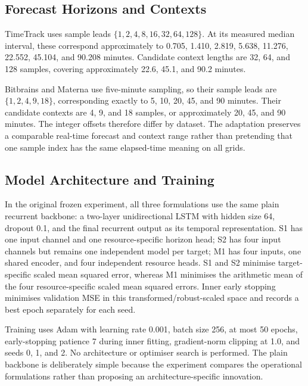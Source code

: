\documentclass[a4paper,fleqn]{cas-dc}
\begin{document}
\subsection{Forecast Horizons and Contexts}
\label{sec:horizons-contexts}

TimeTrack uses sample leads
$\{1,2,4,8,16,32,64,128\}$.  At its measured median interval, these correspond
approximately to 0.705, 1.410, 2.819, 5.638, 11.276, 22.552, 45.104, and
90.208 minutes.  Candidate context lengths are 32, 64, and 128 samples,
covering approximately 22.6, 45.1, and 90.2 minutes.

Bitbrains and Materna use five-minute sampling, so their sample leads are
$\{1,2,4,9,18\}$, corresponding exactly to 5, 10, 20, 45, and 90 minutes.
Their candidate contexts are 4, 9, and 18 samples, or approximately 20, 45,
and 90 minutes.  The integer offsets therefore differ by dataset.  The
adaptation preserves a comparable real-time forecast and context range rather
than pretending that one sample index has the same elapsed-time meaning on all
grids.

\subsection{Model Architecture and Training}
\label{sec:architecture-training}

In the original frozen experiment, all three formulations use the same plain recurrent backbone: a two-layer
unidirectional LSTM with hidden size 64, dropout 0.1, and the final recurrent
output as its temporal representation.  S1 has one input channel and one
resource-specific horizon head; S2 has four input channels but remains one
independent model per target; M1 has four inputs, one shared encoder, and four
independent resource heads.  S1 and S2 minimise target-specific scaled mean
squared error, whereas M1 minimises the arithmetic mean of the four
resource-specific scaled mean squared errors. Inner early stopping minimises
validation MSE in this transformed/robust-scaled space and records a best
epoch separately for each seed.

Training uses Adam with learning rate 0.001, batch size 256, at most 50 epochs,
early-stopping patience 7 during inner fitting, gradient-norm clipping at 1.0,
and seeds 0, 1, and 2.  No architecture or optimiser search is performed.  The
plain backbone is deliberately simple because the experiment compares the
operational formulations rather than proposing an architecture-specific
innovation.
\end{document}
